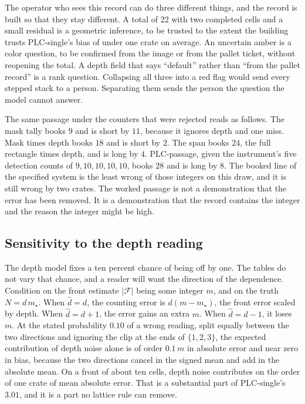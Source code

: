 The operator who sees this record can do three different things, and the record is built so that they stay different. A total of $22$ with two completed cells and a small residual is a geometric inference, to be trusted to the extent the building trusts PLC-single's bias of under one crate on average. An uncertain amber is a color question, to be confirmed from the image or from the pallet ticket, without reopening the total. A depth field that says ``default'' rather than ``from the pallet record'' is a rank question. Collapsing all three into a red flag would send every stepped stack to a person. Separating them sends the person the question the model cannot answer.

The same passage under the counters that were rejected reads as follows. The mask tally books $9$ and is short by $11$, because it ignores depth and one miss. Mask times depth books $18$ and is short by $2$. The span books $24$, the full rectangle times depth, and is long by $4$. PLC-passage, given the instrument's five detection counts of $9,10,10,10,10$, books $28$ and is long by $8$. The booked line of the specified system is the least wrong of those integers on this draw, and it is still wrong by two crates. The worked passage is not a demonstration that the error has been removed. It is a demonstration that the record contains the integer and the reason the integer might be high.

\subsection{Sensitivity to the depth reading}
\label{sec:depth-sensitivity}

The depth model fixes a ten percent chance of being off by one. The tables do not vary that chance, and a reader will want the direction of the dependence. Condition on the front estimate $\lvert\mathcal{F}\rvert$ being some integer $m$, and on the truth $N=d\,m_{\star}$. When $\hat{d}=d$, the counting error is $d(m-m_{\star})$, the front error scaled by depth. When $\hat{d}=d+1$, the error gains an extra $m$. When $\hat{d}=d-1$, it loses $m$. At the stated probability $0.10$ of a wrong reading, split equally between the two directions and ignoring the clip at the ends of $\{1,2,3\}$, the expected contribution of depth noise alone is of order $0.1\,m$ in absolute error and near zero in bias, because the two directions cancel in the signed mean and add in the absolute mean. On a front of about ten cells, depth noise contributes on the order of one crate of mean absolute error. That is a substantial part of PLC-single's $3.01$, and it is a part no lattice rule can remove.

